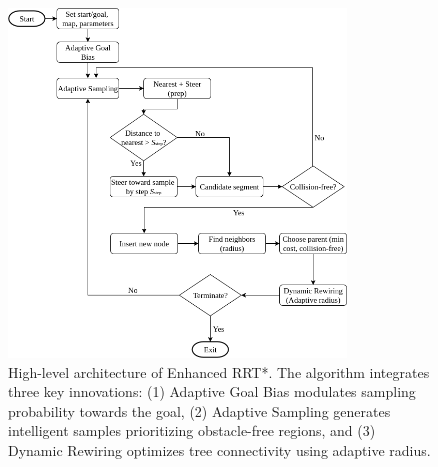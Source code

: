 \documentclass[pdflatex,sn-mathphys-num]{sn-jnl}
\theoremstyle{thmstyleone}%
\theoremstyle{thmstyletwo}%
\theoremstyle{thmstylethree}%
\begin{document}
\begin{figure}[htbp]
\centering
\includegraphics[width=0.8\textwidth]{diagram.png}
\caption{High-level architecture of Enhanced RRT*. The algorithm integrates three key innovations: (1) Adaptive Goal Bias modulates sampling probability towards the goal, (2) Adaptive Sampling generates intelligent samples prioritizing obstacle-free regions, and (3) Dynamic Rewiring optimizes tree connectivity using adaptive radius.}
\label{fig:diagram}
\end{figure}
\end{document}

